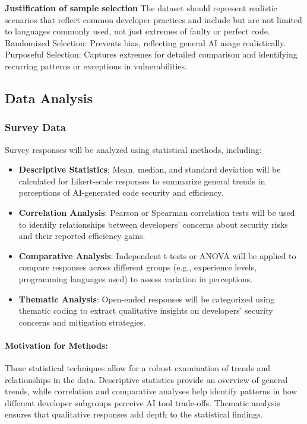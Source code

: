 \textbf{Justification of sample selection}
The dataset should represent realistic scenarios that reflect common developer practices and include but are not limited to languages commonly used, not just extremes of faulty or perfect code. Randomized Selection: Prevents bias, reflecting general AI usage realistically. Purposeful Selection: Captures extremes for detailed comparison and identifying recurring patterns or exceptions in vulnerabilities.

\subsection{Data Analysis}

\subsubsection{Survey Data}

Survey responses will be analyzed using statistical methods, including:

\begin{itemize}
    \item \textbf{Descriptive Statistics}: Mean, median, and standard deviation will be calculated for Likert-scale responses to summarize general trends in perceptions of AI-generated code security and efficiency.
    \item \textbf{Correlation Analysis}: Pearson or Spearman correlation tests will be used to identify relationships between developers’ concerns about security risks and their reported efficiency gains.
    \item \textbf{Comparative Analysis}: Independent t-tests or ANOVA will be applied to compare responses across different groups (e.g., experience levels, programming languages used) to assess variation in perceptions.
    \item \textbf{Thematic Analysis}: Open-ended responses will be categorized using thematic coding to extract qualitative insights on developers' security concerns and mitigation strategies.
\end{itemize}

\paragraph{Motivation for Methods:} These statistical techniques allow for a robust examination of trends and relationships in the data. Descriptive statistics provide an overview of general trends, while correlation and comparative analyses help identify patterns in how different developer subgroups perceive AI tool trade-offs. Thematic analysis ensures that qualitative responses add depth to the statistical findings.

